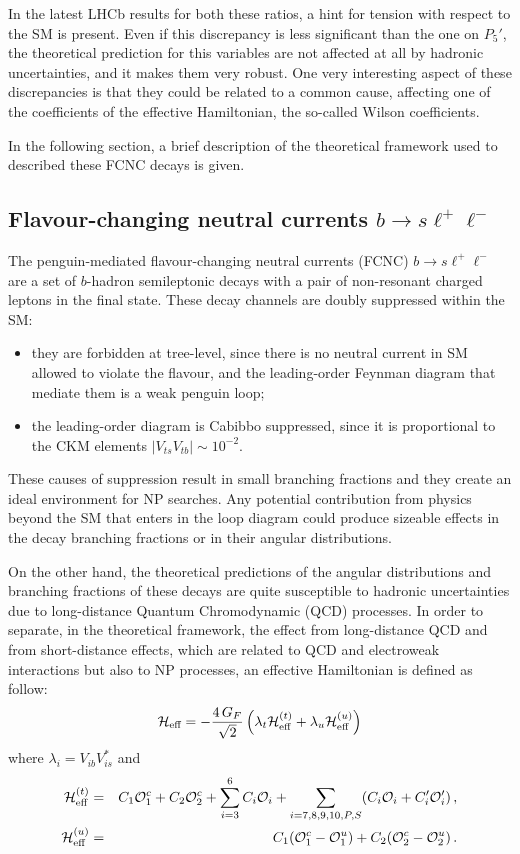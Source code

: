 In the latest LHCb results for both these ratios, a hint for tension with respect to the SM is present.
Even if this discrepancy is less significant than the one on $P_5'$, the theoretical prediction for this variables are not affected at all by hadronic uncertainties, and it makes them very robust.
One very interesting aspect of these discrepancies is that they could be related to a common cause, affecting one of the coefficients of the effective Hamiltonian, the so-called Wilson coefficients.

In the following section, a brief description of the theoretical framework used to described these FCNC decays is given.

\subsection[Flavour-changing neutral currents b to s l l]{Flavour-changing neutral currents $b\to s\ell^+\ell^-$}
\label{sec:FCNC}

The penguin-mediated flavour-changing neutral currents (FCNC) $b\to s\ell^+\ell^-$ are a set of $b$-hadron semileptonic decays with a pair of non-resonant charged leptons in the final state.
These decay channels are doubly suppressed within the SM:
\begin{itemize}
\item they are forbidden at tree-level, since there is no neutral current in SM allowed to violate the flavour, and the leading-order Feynman diagram that mediate them is a weak penguin loop;
\item the leading-order diagram is Cabibbo suppressed, since it is proportional to the CKM elements $|V_{ts}V_{tb}|\sim10^{-2}$.
\end{itemize}
These causes of suppression result in small branching fractions and they create an ideal environment for NP searches.
Any potential contribution from physics beyond the SM that enters in the loop diagram could produce sizeable effects in the decay branching fractions or in their angular distributions.

On the other hand, the theoretical predictions of the angular distributions and branching fractions of these decays are quite susceptible to hadronic uncertainties due to long-distance Quantum Chromodynamic (QCD) processes.
In order to separate, in the theoretical framework, the effect from long-distance QCD and from short-distance effects, which are related to QCD and electroweak interactions but also to NP processes, an effective Hamiltonian is defined as follow:
\begin{equation} \label{eq:Heff}
  {\cal H}_{\textrm{eff}} = - \frac{4\,G_F}{\sqrt{2}}\left(\lambda_t {\cal H}_{\textrm{eff}}^{(t)} + \lambda_u {\cal H}_{\textrm{eff}}^{(u)}\right)
\end{equation}
where $\lambda_i=V_{ib}V_{is}^*$ and
\begin{eqnarray*}
  {\cal H}_{\textrm{eff}}^{(t)} & = & C_1 \mathcal O_1^c + C_2 \mathcal O_2^c + \sum_{i=3}^{6} C_i \mathcal O_i + \sum_{i=7,8,9,10,P,S} (C_i \mathcal O_i + C'_i \mathcal O'_i)\,, \\
  {\cal H}_{\textrm{eff}}^{(u)} & = & C_1 (\mathcal O_1^c-\mathcal O_1^u)  + C_2(\mathcal O_2^c-\mathcal O_2^u)\,.
\end{eqnarray*}

